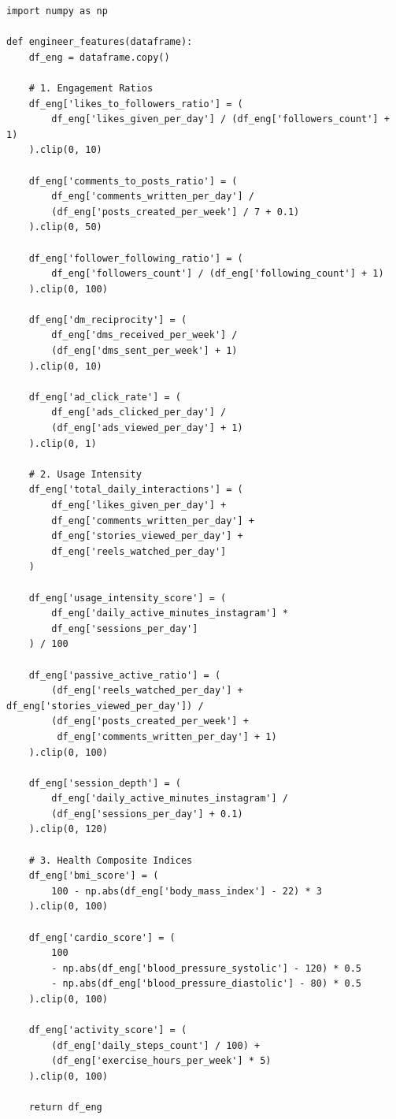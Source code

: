 \documentclass[12pt,a4paper]{article}
\begin{document}
\begin{verbatim}
import numpy as np
 
def engineer_features(dataframe):
    df_eng = dataframe.copy()
 
    # 1. Engagement Ratios
    df_eng['likes_to_followers_ratio'] = (
        df_eng['likes_given_per_day'] / (df_eng['followers_count'] + 1)
    ).clip(0, 10)
 
    df_eng['comments_to_posts_ratio'] = (
        df_eng['comments_written_per_day'] /
        (df_eng['posts_created_per_week'] / 7 + 0.1)
    ).clip(0, 50)
 
    df_eng['follower_following_ratio'] = (
        df_eng['followers_count'] / (df_eng['following_count'] + 1)
    ).clip(0, 100)
 
    df_eng['dm_reciprocity'] = (
        df_eng['dms_received_per_week'] /
        (df_eng['dms_sent_per_week'] + 1)
    ).clip(0, 10)
 
    df_eng['ad_click_rate'] = (
        df_eng['ads_clicked_per_day'] /
        (df_eng['ads_viewed_per_day'] + 1)
    ).clip(0, 1)
 
    # 2. Usage Intensity
    df_eng['total_daily_interactions'] = (
        df_eng['likes_given_per_day'] +
        df_eng['comments_written_per_day'] +
        df_eng['stories_viewed_per_day'] +
        df_eng['reels_watched_per_day']
    )
 
    df_eng['usage_intensity_score'] = (
        df_eng['daily_active_minutes_instagram'] *
        df_eng['sessions_per_day']
    ) / 100
 
    df_eng['passive_active_ratio'] = (
        (df_eng['reels_watched_per_day'] + df_eng['stories_viewed_per_day']) /
        (df_eng['posts_created_per_week'] +
         df_eng['comments_written_per_day'] + 1)
    ).clip(0, 100)
 
    df_eng['session_depth'] = (
        df_eng['daily_active_minutes_instagram'] /
        (df_eng['sessions_per_day'] + 0.1)
    ).clip(0, 120)
 
    # 3. Health Composite Indices
    df_eng['bmi_score'] = (
        100 - np.abs(df_eng['body_mass_index'] - 22) * 3
    ).clip(0, 100)
 
    df_eng['cardio_score'] = (
        100
        - np.abs(df_eng['blood_pressure_systolic'] - 120) * 0.5
        - np.abs(df_eng['blood_pressure_diastolic'] - 80) * 0.5
    ).clip(0, 100)
 
    df_eng['activity_score'] = (
        (df_eng['daily_steps_count'] / 100) +
        (df_eng['exercise_hours_per_week'] * 5)
    ).clip(0, 100)
 
    return df_eng
\end{verbatim}
 
\end{document}

